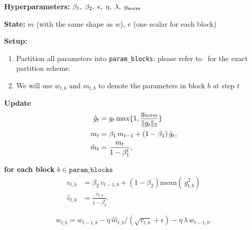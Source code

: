 \begin{algorithm}[H]
  \caption{Adam-mini}
  \label{alg:adammini}
  \begin{tcolorbox}
  \textbf{Hyperparameters:} $\beta_1,\;\beta_2,\;\epsilon,\;\eta,\;\lambda,\;g_{\mathrm{norm}}$

  \textbf{State:} $m$ (with the same shape as $w$),  $v$ (one scalar for each block)

  \textbf{Setup:}
  \begin{enumerate}[left=1em]
    \item Partition all parameters into \texttt{param\_blocks}: please refer to~\cite{zhang2025adamminiusefewerlearning} for the exact partition scheme.
    \item We will use $w_{t,b}$ and $m_{t,b}$ to denote the parameters in block $b$ at step $t$
  \end{enumerate}

  \vspace{0.5ex}

  \textbf{Update}
    \begin{align*}
      \hat g_{t} &= g_{t} \max\{1, \frac{g_{\mathrm{norm}}}{\|g_{t}\|_2}\} \\
      m_{t} &= \beta_1\,m_{t-1} + (1-\beta_1)\,\hat g_{t},\\
      \hat m_{t} &= \frac{m_{t}}{1-\beta_1^t},\quad
    \end{align*}
    
    \textbf{for each block} $b\in\texttt{param\_blocks}$ 
    \begin{align*}
            v_{t,b} &= \beta_2\,v_{t-1,b} + (1-\beta_2) \mathrm{mean}(\,g_{t,b}^2)\\
             \hat v_{t,b} &= \frac{v_{t,b}}{1-\beta_2^t}.
        \end{align*}


    \[
      w_{t,b}
        = w_{t-1,b}
          - \eta\,\hat m_{t,b} / (\sqrt{v_{t,b}} + \epsilon)
          - \eta\,\lambda\,w_{t-1,b}.
    \]
  \end{tcolorbox}
\end{algorithm}

